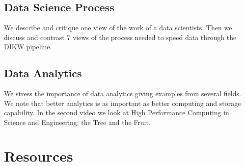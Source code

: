 


\subsection{Data Science Process}\label{data-science-process-1}

We describe and critique one view of the work of a data scientists. Then
we discuss and contrast 7 views of the process needed to speed data
through the DIKW pipeline.




\subsection{Data Analytics}\label{data-analytics}



We stress the importance of data analytics giving examples from several
fields. We note that better analytics is as important as better
computing and storage capability. In the second video we look at High
Performance Computing in Science and Engineering: the Tree and the
Fruit.





\section{Resources}

